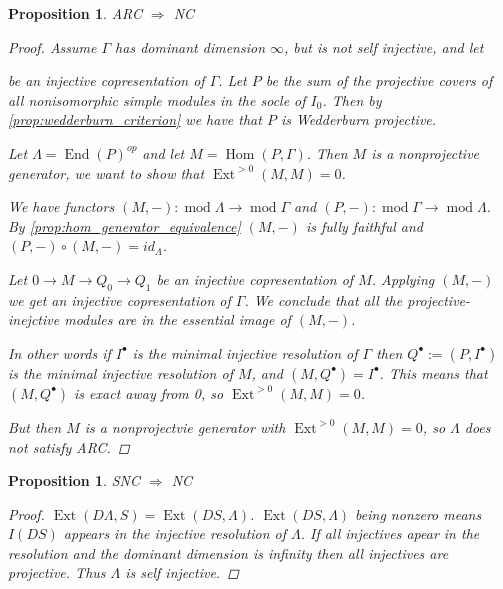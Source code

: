 \documentclass[11pt, a4paper, english]{article}
\newtheorem{prop}[theorem]{Proposition}
\theoremstyle{definition}
\DeclareMathOperator{\Hom}{Hom}
\DeclareMathOperator{\Ext}{Ext}
\DeclareMathOperator{\End}{End}
\def\mod{\operatorname{mod}}
\begin{document}
\begin{prop}
	ARC $\Rightarrow$ NC
	\begin{proof}
		Assume $\Gamma$ has dominant dimension $\infty$, but is not self injective, and let
		\begin{center}
		\end{center}
		be an injective copresentation of $\Gamma$. Let $P$ be the sum of the projective covers of all nonisomorphic simple modules in the socle of $I_0$. Then by \cref{prop:wedderburn_criterion} we have that $P$ is Wedderburn projective.
		
		Let $\Lambda = \End(P)^{op}$ and let $M = \Hom(P, \Gamma)$. Then $M$ is a nonprojective generator, we want to show that $\Ext^{>0}(M,M)=0$.
		
		We have functors $(M,-):\mod\Lambda \to \mod\Gamma$ and $(P,-):\mod\Gamma \to \mod\Lambda$. By \cref{prop:hom_generator_equivalence} $(M, -)$ is fully faithful and $(P,-)\circ (M,-) = id_{\Lambda}$.
		
		Let $0\to M \to Q_0 \to Q_1$ be an injective copresentation of $M$. Applying $(M,-)$ we get an injective copresentation of $\Gamma$. We conclude that all the projective-inejctive modules are in the essential image of $(M,-)$.
		
		In other words if $I^\bullet$ is the minimal injective resolution of $\Gamma$ then $Q^\bullet := (P, I^\bullet)$ is the minimal injective resolution of $M$, and $(M, Q^\bullet)=I^\bullet$. This means that $(M, Q^\bullet)$ is exact away from 0, so $\Ext^{>0}(M,M)=0$. 
		
		But then $M$ is a nonprojectvie generator with $\Ext^{>0}(M,M)=0$, so $\Lambda$ does not satisfy ARC.
	\end{proof}
\end{prop}

\begin{prop}\cite{AR75}
	SNC $\Rightarrow$ NC
	\begin{proof}
		$\Ext(D\Lambda, S) = \Ext(DS, \Lambda)$. $\Ext(DS, \Lambda)$ being nonzero means $I(DS)$ appears in the injective resolution of $\Lambda$. If all injectives apear in the resolution and the dominant dimension is infinity then all injectives are projective. Thus $\Lambda$ is self injective.
	\end{proof}
\end{prop}
\end{document}
